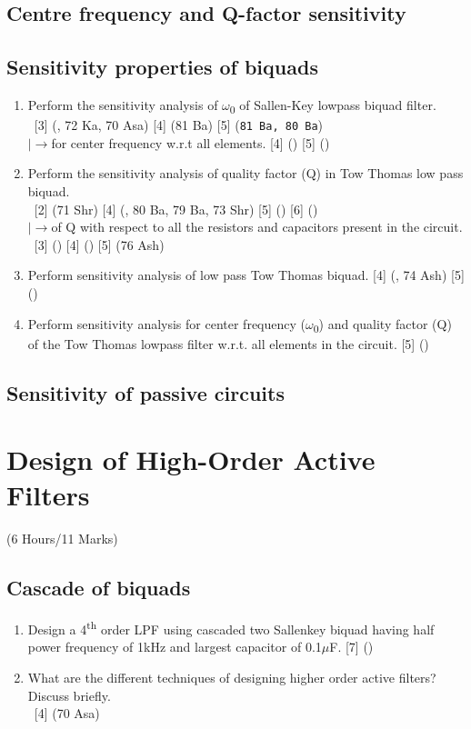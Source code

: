 \documentclass[12pt]{article}
\newcommand{\w}{\(\omega\)}
\newcommand{\lb}{\\$\left|\rightarrow\right.$}
\newcommand{\enter}{\\\textcolor{white}{1}}
\newcommand{\sub}[1]{\textsubscript{#1}}
\newcommand{\super}[1]{\textsuperscript{#1}}
\begin{document}
	\subsection{Centre frequency and Q-factor sensitivity}
	\subsection{Sensitivity properties of biquads}
		\begin{enumerate}
			\item Perform the sensitivity analysis of \w\sub{0} of Sallen-Key lowpass biquad filter.
			\enter\hfill [3] {\footnotesize (, 72 Ka, 70 Asa)} [4] {\footnotesize (81 Ba) } [5] {\footnotesize (\texttt{81 Ba, 80 Ba})}
			\lb for center frequency w.r.t all elements. \hfill [4] {\footnotesize ()} [5] {\footnotesize ()}

			\item Perform the sensitivity analysis of quality factor (Q) in Tow Thomas low pass biquad.
			\enter\hfill [2] {\footnotesize (71 Shr)} [4] {\footnotesize (, 80 Ba, 79 Ba, 73 Shr)} [5] {\footnotesize ()} [6] {\footnotesize ()}
			\lb of Q with respect to all the resistors and capacitors present in the circuit. 
			\enter\hfill[3] () [4] () [5] (76 Ash)

			\item Perform sensitivity analysis of low pass Tow Thomas biquad. \hfill [4] (, 74 Ash) [5] ()

			\item Perform sensitivity analysis for center frequency (\w\sub{0}) and quality factor (Q) of the Tow Thomas lowpass filter w.r.t. all elements in the circuit. \hfill [5] ()
		\end{enumerate}
	\subsection{Sensitivity of passive circuits}

	\pagebreak
	
\section{Design of High-Order Active Filters}
	\begin{center}(6 Hours/11 Marks)\end{center}
	\subsection{Cascade of biquads}
		\begin{enumerate}
			\item Design a 4\super{th} order LPF using cascaded two Sallenkey biquad having half power frequency of 1kHz and largest capacitor of 0.1$\mu$F. \hfill [7] ()
			
			

			\item What are the different techniques of designing higher order active filters? Discuss briefly.
			\enter\hfill [4] (70 Asa)	
		\end{enumerate}
\end{document}
